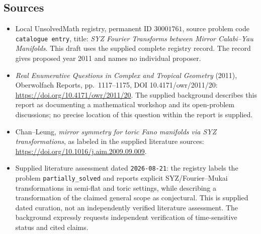 \documentclass[11pt]{article}
\begin{document}
\subsection{Sources}
\begin{itemize}
\item Local UnsolvedMath registry, permanent ID \(30001761\), source problem code \texttt{catalogue entry}, title: \emph{SYZ Fourier Transforms between Mirror Calabi--Yau Manifolds}. This draft uses the supplied complete registry record. The record gives proposed year 2011 and names no individual proposer.
\item \emph{Real Enumerative Questions in Complex and Tropical Geometry} (2011), Oberwolfach Reports, pp.\ 1117--1175, DOI 10.4171/owr/2011/20: \url{https://doi.org/10.4171/owr/2011/20}. The supplied background describes this report as documenting a mathematical workshop and its open-problem discussions; no precise location of this question within the report is supplied.
\item Chan--Leung, \emph{mirror symmetry for toric Fano manifolds via SYZ transformations}, as labeled in the supplied literature sources: \url{https://doi.org/10.1016/j.aim.2009.09.009}.
\item Supplied literature assessment dated \texttt{2026-08-21}: the registry labels the problem \texttt{partially\_solved} and reports explicit SYZ/Fourier--Mukai transformations in semi-flat and toric settings, while describing a transformation of the claimed general scope as conjectural. This is supplied dated curation, not an independently verified literature assessment. The background expressly requests independent verification of time-sensitive status and cited claims.
\end{itemize}
\end{document}
